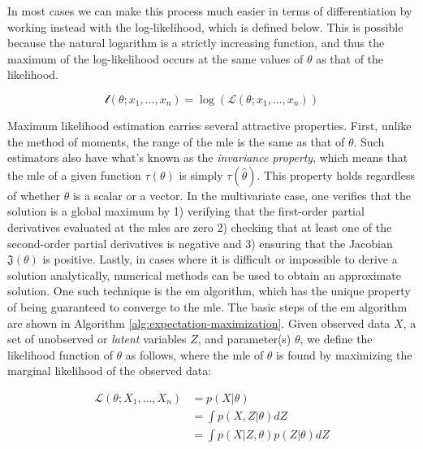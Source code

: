 \documentclass{report}
\begin{document}
In most cases we can make this process much easier in terms of differentiation by working instead with the log-likelihood, which is defined below. This is possible because the natural logarithm is a strictly increasing function, and thus the maximum of the log-likelihood occurs at the same values of $\theta$ as that of the likelihood. 

\begin{equation}\label{eq:log-likelihood}
    \mathcal{l}(\theta; x_1, \dots, x_n) = \log\left(\mathcal{L}(\theta; x_1, \dots, x_n)\right)
\end{equation}

Maximum likelihood estimation carries several attractive properties. First, unlike the method of moments, the range of the \gls{mle} is the same as that of $\theta$. Such estimators also have what's known as the \textit{invariance property}, which means that the \gls{mle} of a given function $\tau(\theta)$ is simply $\tau\left(\hat{\theta}\right)$. This property holds regardless of whether $\theta$ is a scalar or a vector. In the multivariate case, one verifies that the solution is a global maximum by 1) verifying that the first-order partial derivatives evaluated at the \glspl{mle} are zero 2) checking that at least one of the second-order partial derivatives is negative and 3) ensuring that the Jacobian $\mathfrak{J}(\theta)$ is positive. Lastly, in cases where it is difficult or impossible to derive a solution analytically, numerical methods can be used to obtain an approximate solution. One such technique is the \gls{em} algorithm, which has the unique property of being guaranteed to converge to the \gls{mle}. The basic steps of the \gls{em} algorithm are shown in Algorithm \ref{alg:expectation-maximization}. Given observed data $X$, a set of unobserved or \textit{latent} variables $Z$, and parameter(s) $\theta$, we define the likelihood function of $\theta$ as follows, where the \gls{mle} of $\theta$ is found by maximizing the marginal likelihood of the observed data:

\begin{equation}\label{eq:expectation-maximization-likelihood}
    \begin{aligned}
        \mathcal{L}(\theta;  X_1, \dots, X_n) 
          &= p(X | \theta) \\
          &= \int p(X, Z | \theta) dZ \\
          &= \int p(X | Z, \theta) p(Z|\theta) dZ 
    \end{aligned}
\end{equation}
\end{document}
